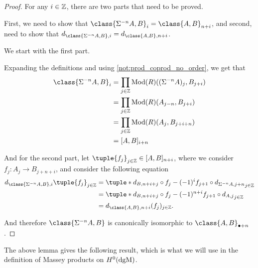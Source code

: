 \begin{proof}
    For any \( i \in {\mathbb{Z}} \), there are two parts that need to be proved.

    First, we need to show that \( \class{\Sigma^{-n} A, B}_i = \class{A, B}_{n + i} \), and second, need to show that \( d_{\class{\Sigma^{-n} A, B}, i} = d_{\class{A, B}, n + i} \).

    We start with the first part.

    Expanding the definitions and using \autoref{not:prod_coprod_no_order}, we get that
    \begin{align*}
        \class{\Sigma^{-n} A, B}_i &= \prod_{j \in \Zb} \Mod(R)((\Sigma^{-n} A)_j, B_{j + i}) \\
        &= \prod_{j \in \Zb} \Mod(R)(A_{j - n}, B_{j + i}) \\
        &= \prod_{j \in \Zb} \Mod(R)(A_j, B_{j + i + n}) \\
        &= [A, B]_{i + n}
    \end{align*}

    And for the second part, let \( \tuple{f_j}_{j \in \Zb} \in [A, B]_{n + i} \), where we consider \( f_j: A_j \to B_{j + n + i} \), and consider the following equation
    \begin{align*}
        d_{\class{\Sigma^{-n} A, B}, i}\tuple{f_j}_{j \in \Zb} &= \tuple*{d_{B, n + i + j} \circ f_j - (-1)^i f_{j + 1} \circ d_{\Sigma^{-n} A, j + n}}_{j \in \Zb} \\
        &= \tuple*{d_{B, n + i + j} \circ f_j - (-1)^{n + i} f_{j + 1} \circ d_{A, j}}_{j \in \Zb} \\
        &= d_{\class{A, B}, n + i}(f_j)_{j \in \Zb}.
    \end{align*}

    And therefore \( \class{\Sigma^{-n} A, B} \) is canonically isomorphic to \( \class{A, B}_{\bullet+n} \).
\end{proof}

The above lemma gives the following result, which is what we will use in the definition of Massey products on \( H^0(\operatorname{dgM}) \). 

